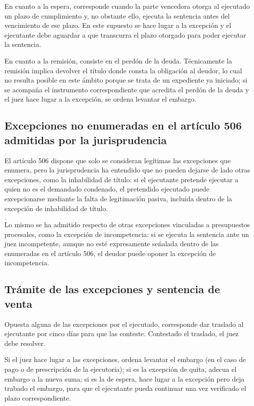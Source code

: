 \documentclass[12pt,oneside]{book}
\begin{document}
En cuanto a la espera, corresponde cuando la parte vencedora otorga al ejecutado un plazo de cumplimiento y, no obstante ello, ejecuta la sentencia antes del vencimiento de ese plazo. En este supuesto se hace lugar a la excepci\'on y el ejecutante debe aguardar a que transcurra el plazo otorgado para poder ejecutar la sentencia.

En cuanto a la remisi\'on, consiste en el perd\'on de la deuda. T\'ecnicamente la remisi\'on implica devolver el t\'itulo donde consta la obligaci\'on al deudor, lo cual no resulta posible en este \'ambito porque se trata de un expediente ya iniciado; si se acompa\'na el instrumento correspondiente que acredita el perd\'on de la deuda y el juez hace lugar a la excepci\'on, se ordena levantar el embargo.

\subsection{Excepciones no enumeradas en el art\'iculo 506 admitidas por la jurisprudencia}

El art\'iculo 506 dispone que solo se consideran leg\'itimas las excepciones que enumera, pero la jurisprudencia ha entendido que no pueden dejarse de lado otras excepciones, como la inhabilidad de t\'itulo: si el ejecutante pretende ejecutar a quien no es el demandado condenado, el pretendido ejecutado puede excepcionarse mediante la falta de legitimaci\'on pasiva, incluida dentro de la excepci\'on de inhabilidad de t\'itulo.

Lo mismo se ha admitido respecto de otras excepciones vinculadas a presupuestos procesales, como la excepci\'on de incompetencia: si se ejecuta la sentencia ante un juez incompetente, aunque no est\'e expresamente se\'nalada dentro de las enumeradas en el art\'iculo 506, el deudor puede oponer la excepci\'on de incompetencia.

\subsection{Tr\'amite de las excepciones y sentencia de venta}

Opuesta alguna de las excepciones por el ejecutado, corresponde dar traslado al ejecutante por cinco d\'ias para que las conteste. Contestado el traslado, el juez debe resolver.

Si el juez hace lugar a las excepciones, ordena levantar el embargo (en el caso de pago o de prescripci\'on de la ejecutoria); si es la excepci\'on de quita, adecua el embargo a la nueva suma; si es la de espera, hace lugar a la excepci\'on pero deja trabado el embargo, para que el ejecutante pueda continuar una vez verificado el plazo correspondiente.
\end{document}
